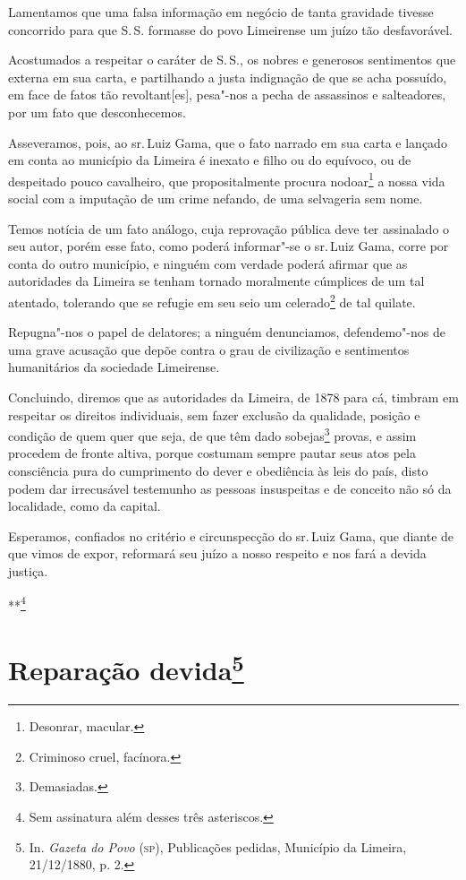 Lamentamos que uma falsa informação em negócio de tanta gravidade
tivesse concorrido para que S.\,S. formasse do povo Limeirense um juízo
tão desfavorável.

Acostumados a respeitar o caráter de S.\,S., os nobres e generosos
sentimentos que externa em sua carta, e partilhando a justa indignação
de que se acha possuído, em face de fatos tão revoltant{[}es{]},
pesa"-nos a pecha de assassinos e salteadores, por um fato que
desconhecemos.

Asseveramos, pois, ao sr.\,Luiz Gama, que o fato narrado em sua carta e
lançado em conta ao município da Limeira é inexato e filho ou do
equívoco, ou de despeitado pouco cavalheiro, que propositalmente procura
nodoar\footnote{Desonrar, macular.} a nossa vida social com a
imputação de um crime nefando, de uma selvageria sem nome.

Temos notícia de um fato análogo, cuja reprovação pública deve ter
assinalado o seu autor, porém esse fato, como poderá informar"-se o sr.\,Luiz Gama, corre por conta do outro município, e ninguém com verdade
poderá afirmar que as autoridades da Limeira se tenham tornado
moralmente cúmplices de um tal atentado, tolerando que se refugie em seu
seio um celerado\footnote{Criminoso cruel, facínora.} de tal quilate.

Repugna"-nos o papel de delatores; a ninguém denunciamos, defendemo"-nos
de uma grave acusação que depõe contra o grau de civilização e
sentimentos humanitários da sociedade Limeirense.

Concluindo, diremos que as autoridades da Limeira, de 1878 para cá,
timbram em respeitar os direitos individuais, sem fazer exclusão da
qualidade, posição e condição de quem quer que seja, de que têm dado
sobejas\footnote{Demasiadas.} provas, e assim procedem de fronte
altiva, porque costumam sempre pautar seus atos pela consciência pura do
cumprimento do dever e obediência às leis do país, disto podem dar
irrecusável testemunho as pessoas insuspeitas e de conceito não só da
localidade, como da capital.

Esperamos, confiados no critério e circunspecção do sr.\,Luiz Gama, que
diante de que vimos de expor, reformará seu juízo a nosso respeito e nos
fará a devida justiça.

\bigskip

\hfill***\footnote{Sem assinatura além desses três asteriscos.}


\chapter{Reparação devida\footnote[*]{In. \emph{Gazeta do Povo} (\textsc{sp}),
  Publicações pedidas, Município da Limeira, 21/12/1880, p. 2.}}

